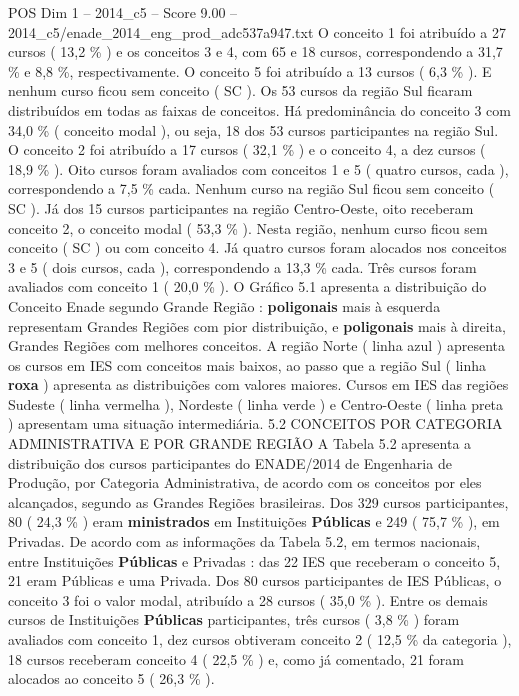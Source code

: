 \begin{textsample}{POS Dim 1 – 2014\_c5 – Score 9.00 – 2014\_c5/enade\_2014\_eng\_prod\_adc537a947.txt}
O conceito 1 foi atribuído a 27 cursos ( 13,2 \% ) e os conceitos 3 e 4, com 65 e 18 cursos, correspondendo a 31,7 \% e 8,8 \%, respectivamente.
O conceito 5 foi atribuído a 13 cursos ( 6,3 \% ).
E nenhum curso ficou sem conceito ( SC ).
Os 53 cursos da região Sul ficaram distribuídos em todas as faixas de conceitos.
Há predominância do conceito 3 com 34,0 \% ( conceito modal ), ou seja, 18 dos 53 cursos participantes na região Sul.
O conceito 2 foi atribuído a 17 cursos ( 32,1 \% ) e o conceito 4, a dez cursos ( 18,9 \% ).
Oito cursos foram avaliados com conceitos 1 e 5 ( quatro cursos, cada ), correspondendo a 7,5 \% cada.
Nenhum curso na região Sul ficou sem conceito ( SC ).
Já dos 15 cursos participantes na região Centro-Oeste, oito receberam conceito 2, o conceito modal ( 53,3 \% ).
Nesta região, nenhum curso ficou sem conceito ( SC ) ou com conceito 4.
Já quatro cursos foram alocados nos conceitos 3 e 5 ( dois cursos, cada ), correspondendo a 13,3 \% cada.
Três cursos foram avaliados com conceito 1 ( 20,0 \% ).
O Gráfico 5.1 apresenta a distribuição do Conceito Enade segundo Grande Região : \textbf{poligonais} mais à esquerda representam Grandes Regiões com pior distribuição, e \textbf{poligonais} mais à direita, Grandes Regiões com melhores conceitos.
A região Norte ( linha azul ) apresenta os cursos em IES com conceitos mais baixos, ao passo que a região Sul ( linha \textbf{roxa} ) apresenta as distribuições com valores maiores.
Cursos em IES das regiões Sudeste ( linha vermelha ), Nordeste ( linha verde ) e Centro-Oeste ( linha preta ) apresentam uma situação intermediária. 5.2 CONCEITOS POR CATEGORIA ADMINISTRATIVA E POR GRANDE REGIÃO A Tabela 5.2 apresenta a distribuição dos cursos participantes do ENADE/2014 de Engenharia de Produção, por Categoria Administrativa, de acordo com os conceitos por eles alcançados, segundo as Grandes Regiões brasileiras.
Dos 329 cursos participantes, 80 ( 24,3 \% ) eram \textbf{ministrados} em Instituições \textbf{Públicas} e 249 ( 75,7 \% ), em Privadas.
De acordo com as informações da Tabela 5.2, em termos nacionais, entre Instituições \textbf{Públicas} e Privadas : das 22 IES que receberam o conceito 5, 21 eram Públicas e uma Privada.
Dos 80 cursos participantes de IES Públicas, o conceito 3 foi o valor modal, atribuído a 28 cursos ( 35,0 \% ).
Entre os demais cursos de Instituições \textbf{Públicas} participantes, três cursos ( 3,8 \% ) foram avaliados com conceito 1, dez cursos obtiveram conceito 2 ( 12,5 \% da categoria ), 18 cursos receberam conceito 4 ( 22,5 \% ) e, como já comentado, 21 foram alocados ao conceito 5 ( 26,3 \% ).

\end{textsample}
